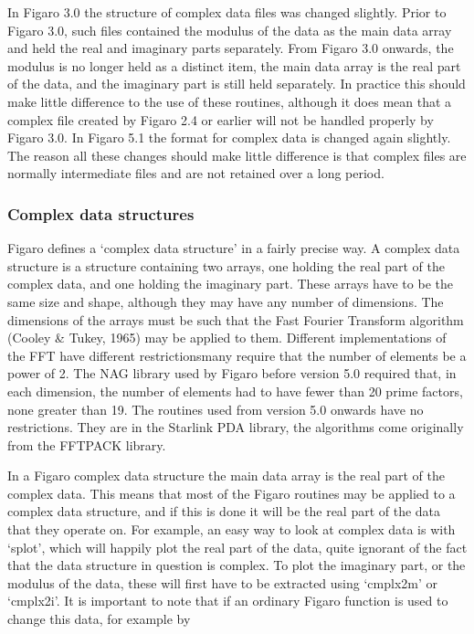   In Figaro 3.0 the structure of complex data files was changed
   slightly. Prior to Figaro 3.0, such files contained the modulus of
   the data as the main data array and held the real and imaginary parts
   separately.  From Figaro 3.0 onwards, the modulus is no longer held
   as a distinct item, the main data array is the real part of the data,
   and the imaginary part is still held separately. In practice this
   should make little difference to the use of these routines, although
   it does mean that a complex file created by Figaro 2.4 or earlier
   will not be handled properly by Figaro 3.0. In Figaro 5.1 the
   format for complex data is changed again slightly. The reason all
   these changes should make little difference is that complex files
   are normally intermediate files and are not retained over a long
   period.


\subsubsection{\label{techno6struct}Complex data structures}

   Figaro defines a `complex data structure' in a fairly precise way. A
   complex data structure is a structure containing two arrays, one
   holding the real part of the complex data, and one holding the
   imaginary part. These arrays have to be the same size and shape,
   although they may have any number of dimensions.  The dimensions of
   the arrays must be such that the Fast Fourier Transform algorithm
   (Cooley \& Tukey, 1965) may be applied to them. Different
   implementations of the FFT have different restrictions\latorhtm{---}{-}many
   require
   that the number of elements be a power of 2. The NAG library used by
   Figaro before version 5.0 required that, in each dimension, the number of
   elements had to have fewer than 20 prime factors, none greater than 19.
   The routines used from version 5.0 onwards have no restrictions. They
   are in the Starlink PDA library, the algorithms come originally from
   the FFTPACK library.

   In a Figaro complex data structure the main data array is the real
   part of the complex data. This means that most of the Figaro routines
   may be applied to a complex data structure, and if this is done it
   will be the real part of the data that they operate on.  For example,
   an easy way to look at complex data is with `splot', which will
   happily plot the real part of the data, quite ignorant of the fact
   that the data structure in question is complex.  To plot the
   imaginary part, or the modulus of the data, these will first have to
   be extracted using `cmplx2m' or `cmplx2i'.  It is important to note
   that if an ordinary Figaro function is used to change this data, for
   example by

